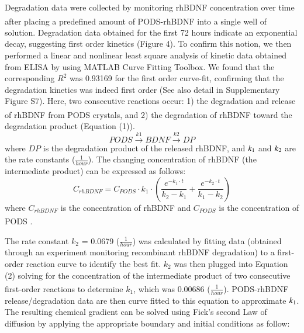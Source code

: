 \documentclass[review]{elsarticle}
\begin{document}
Degradation data were collected by monitoring rhBDNF concentration over time after placing a predefined amount of PODS\textsuperscript{\textregistered}-rhBDNF into a single well of solution. Degradation data obtained for the first 72 hours indicate an exponential decay, suggesting first order kinetics (Figure 4). To confirm this notion, we then performed a linear and nonlinear least square analysis of kinetic data obtained from ELISA by using MATLAB Curve Fitting Toolbox. We found that the corresponding $R^{2}$ was 0.93169 for the first order curve-fit, confirming that the degradation kinetics was indeed first order (See also detail in Supplementary Figure S7). Here, two consecutive reactions occur: 1) the degradation and release of rhBDNF from PODS\textsuperscript{\textregistered} crystals, and 2) the degradation of rhBDNF toward the degradation product (Equation (1)). 
\begin{equation}
PODS\overset{k1}{\longrightarrow}BDNF\overset{k2}{\longrightarrow}DP
\end{equation}
where $DP$ is the degradation product of the released rhBDNF, and $k\textsubscript{1}$ and $k\textsubscript{2}$ are the rate constants ($\frac{1}{hour}$). The changing concentration of rhBDNF (the intermediate product) can be expressed as follows:  
\begin{equation}
C_{rhBDNF} =  C_{PODS} \cdot k_1 \cdot (\frac{e^{-k_1 \cdot t}}{ k_2-  k_1}  + \frac{e^{-k_2 \cdot t}}{ k_1 -  k_2} )
\end{equation}
where $C_{rhBDNF}$ is the concentration of rhBDNF and $C_{PODS}$ is the concentration of PODS\textsuperscript{\textregistered} \cite{levenspiel1999}.

The rate constant $k_{2}$ = 0.0679 ($\frac{1}{hour}$) was calculated by fitting data (obtained through an experiment monitoring recombinant rhBDNF degradation) to a first-order reaction curve to identify the best fit. $k_{2}$ was then plugged into Equation (2) solving for the concentration of the intermediate product of two consecutive first-order reactions to determine $k_{1}$, which was 0.00686 ($\frac{1}{hour}$). PODS\textsuperscript{\textregistered}-rhBDNF release/degradation data are then curve fitted to this equation to approximate $k\textsubscript{1}$. The resulting chemical gradient can be solved using Fick’s second Law of diffusion by applying the appropriate boundary and initial conditions as follow: 
\end{document}
